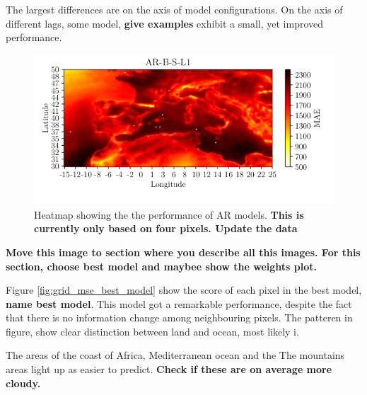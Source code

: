 The largest differences are on the axis of model configurations. On the axis of different lags, some model, \textbf{give examples} exhibit a small, yet improved performance. 
\begin{figure}
    \centering
    \includegraphics{python_figs/mea_best_ar_model_tcc_L1_in_folder_AR-B-S-L1.png}
    \caption{Heatmap showing the the performance of AR models. \textbf{This is currently only based on four pixels. Update the data}}
    \label{fig:results_ar_models}
\end{figure}
\textbf{Move this image to section where you describe all this images. For this section, choose best model and maybee show the weights plot.}

Figure \ref{fig:grid_mse_best_model} show the score of each pixel in the best model, \textbf{name best model}. This model got a remarkable performance, despite the fact that there is no information change among neighbouring pixels. The patteren in figure, show clear distinction between land and ocean, most likely i.

The areas of the coast of Africa, Mediterranean ocean and the
The mountains areas light up as easier to predict. \textbf{Check if these are on average more cloudy.}

